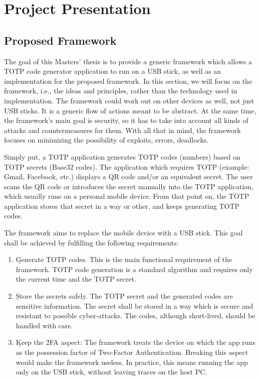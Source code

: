 \chapter{Project Presentation} \label{lab:project-presentation}


\section{Proposed Framework} \label{lab:ch4-proposed-framework}

The goal of this Masters' thesis is to provide a generic framework which allows a TOTP code generator application to run on a USB stick, as well as an implementation for the proposed framework.
In this section, we will focus on the framework, i.e., the ideas and principles, rather than the technology used in implementation.
The framework could work out on other devices as well, not just USB sticks.
It is a generic flow of actions meant to be abstract.
At the same time, the framework's main goal is security, so it has to take into account all kinds of attacks and countermeasures for them.
With all that in mind, the framework focuses on minimizing the possibility of exploits, errors, deadlocks.

Simply put, a TOTP application generates TOTP codes (numbers) based on TOTP secrets (Base32 codes).
The application which requires TOTP (example: Gmail, Facebook, etc.) displays a QR code and/or an equivalent secret.
The user scans the QR code or introduces the secret manually into the TOTP application, which usually runs on a personal mobile device.
From that point on, the TOTP application stores that secret in a way or other, and keeps generating TOTP codes.

The framework aims to replace the mobile device with a USB stick.
This goal shall be achieved by fulfilling the following requirements:
\begin{enumerate}
    \item
        \b{Generate TOTP codes}.
        This is the main functional requirement of the framework.
        TOTP code generation is a standard algorithm and requires only the current time and the TOTP secret.
    \item
        \b{Store the secrets safely}.
        The TOTP secret and the generated codes are sensitive information.
        The secret shall be stored in a way which is secure and resistant to possible cyber-attacks.
        The codes, although short-lived, should be handled with care.
    \item
        \b{Keep the 2FA aspect}:
        The framework treats the device on which the app runs as the possession factor of Two-Factor Authentication.
        Breaking this aspect would make the framework useless.
        In practice, this means running the app only on the USB stick, without leaving traces on the host PC.
\end{enumerate}

